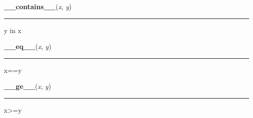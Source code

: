     \label{resource:struct_rusage:__contains__}

    \vspace{0.5ex}

\hspace{.8\funcindent}\begin{boxedminipage}{\funcwidth}

    \raggedright \textbf{\_\_contains\_\_}(\textit{x}, \textit{y})

    \vspace{-1.5ex}

    \rule{\textwidth}{0.5\fboxrule}
\setlength{\parskip}{2ex}
    y in x

\setlength{\parskip}{1ex}
    \end{boxedminipage}

    \label{resource:struct_rusage:__eq__}

    \vspace{0.5ex}

\hspace{.8\funcindent}\begin{boxedminipage}{\funcwidth}

    \raggedright \textbf{\_\_eq\_\_}(\textit{x}, \textit{y})

    \vspace{-1.5ex}

    \rule{\textwidth}{0.5\fboxrule}
\setlength{\parskip}{2ex}
    x==y

\setlength{\parskip}{1ex}
    \end{boxedminipage}

    \label{resource:struct_rusage:__ge__}

    \vspace{0.5ex}

\hspace{.8\funcindent}\begin{boxedminipage}{\funcwidth}

    \raggedright \textbf{\_\_ge\_\_}(\textit{x}, \textit{y})

    \vspace{-1.5ex}

    \rule{\textwidth}{0.5\fboxrule}
\setlength{\parskip}{2ex}
    x{\textgreater}=y

\setlength{\parskip}{1ex}
    \end{boxedminipage}

